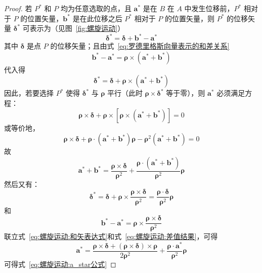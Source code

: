 \begin{proof}
    若 $P^*$ 和 $P$ 均为任意选取的点，且 $\bm{a}^*$ 是在 $B$ 在 $A$ 中发生位移前，$P^*$ 相对于 $P$ 的位置矢量，$\bm{b}^*$ 是在此位移之后 $P^*$ 相对于 $P$ 的位置矢量，则 $P^*$ 的位移矢量 $\bm{\delta}^*$ 可表示为（见图~\ref{fig:螺旋运动}）
\begin{equation}
    \bm{\delta}^* = \bm{\delta} + \bm{b}^* - \bm{a}^*
    \label{eq:螺旋运动:delta_star定义}
\end{equation}
其中 $\bm{\delta}$ 是点 $P$ 的位移矢量；且由式~\eqref{eq:罗德里格斯向量表示的和差关系}
\begin{equation}
    \bm{b}^* - \bm{a}^* = \bm{\rho} \times (\bm{a}^* + \bm{b}^*)
    \label{eq:螺旋运动:差值关系}
\end{equation}
代入得
\begin{equation}
    \bm{\delta}^* = \bm{\delta} + \bm{\rho} \times (\bm{a}^* + \bm{b}^*)
    \label{eq:螺旋运动:delta_star代入}
\end{equation}
因此，若要选择 $P^*$ 使得 $\bm{\delta}^*$ 与 $\bm{\rho}$ 平行（此时 $\bm{\rho} \times \bm{\delta}^*$ 等于零），则 $\bm{a}^*$ 必须满足方程：
\begin{equation}
    \bm{\rho} \times \bm{\delta} + \bm{\rho} \times [\bm{\rho} \times (\bm{a}^* + \bm{b}^*)] = 0
    \label{eq:螺旋运动:平行条件}
\end{equation}
或等价地，
\begin{equation}
    \bm{\rho} \times \bm{\delta} + \bm{\rho} \cdot (\bm{a}^* + \bm{b}^*) \bm{\rho} - \bm{\rho}^2 (\bm{a}^* + \bm{b}^*) = 0
    \label{eq:螺旋运动:三重积展开}
\end{equation}
故
\begin{equation}
    \bm{a}^* + \bm{b}^* = \frac{\bm{\rho} \times \bm{\delta}}{\bm{\rho}^2} + \frac{\bm{\rho} \cdot (\bm{a}^* + \bm{b}^*)}{\bm{\rho}^2} \bm{\rho}
    \label{eq:螺旋运动:和矢表达式}
\end{equation}
然后又有：
\begin{equation}
    \bm{\delta}^* = \bm{\delta} + \bm{\rho} \times \frac{\bm{\rho} \times \bm{\delta}}{\bm{\rho}^2} = \frac{\bm{\rho} \cdot \bm{\delta}}{\bm{\rho}^2} \bm{\rho}
    \label{eq:螺旋运动:delta_star公式}
\end{equation}
和
\begin{equation}
    \bm{b}^* - \bm{a}^* = \bm{\rho} \times \frac{\bm{\rho} \times \bm{\delta}}{\bm{\rho}^2}
    \label{eq:螺旋运动:差值结果}
\end{equation}
联立式~\eqref{eq:螺旋运动:和矢表达式}和式~\eqref{eq:螺旋运动:差值结果}，可得
\begin{equation}
    \bm{a}^* = \frac{\bm{\rho} \times \bm{\delta} + (\bm{\rho} \times \bm{\delta}) \times \bm{\rho}}{2\bm{\rho}^2} + \frac{\bm{\rho} \cdot \bm{a}^*}{\bm{\rho}^2 }\bm{\rho}
\end{equation}可得式~\eqref{eq:螺旋运动:a_star公式}


\end{proof}
